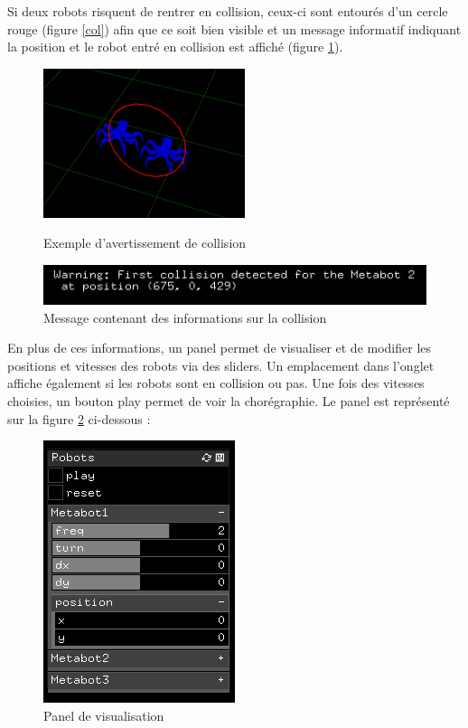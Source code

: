 Si deux robots risquent de rentrer en collision, ceux-ci sont entourés d'un cercle rouge (figure \ref{col}) afin que ce soit bien visible et un message informatif indiquant la position et le robot entré en collision est affiché (figure \ref{mcol}).

\begin{figure}[htbp]
\begin{minipage}[c]{.45\linewidth}
\begin{center}
\includegraphics[scale=0.5]{imgs/collision}
\caption{Exemple d'avertissement de collision}
\label{col}
\end{center}
\end{minipage}
\hspace*{0.5cm}
\begin{minipage}[c]{.5\linewidth}
\begin{center}
\includegraphics[scale=0.6]{imgs/mcollision}
\caption{Message contenant des informations sur la collision}
\label{mcol}
\end{center}
\end{minipage}
\end{figure}

En plus de ces informations, un panel permet de visualiser et de modifier les positions et vitesses des robots via des sliders. Un emplacement dans l'onglet affiche également si les robots sont en collision ou pas. Une fois des vitesses choisies, un bouton play permet de voir la chorégraphie. Le panel est représenté sur la figure \ref{pan} ci-dessous :

\begin{figure}[H]
\centering
\includegraphics[scale=0.65]{imgs/panel2}
\caption{Panel de visualisation}
\label{pan}
\end{figure}

